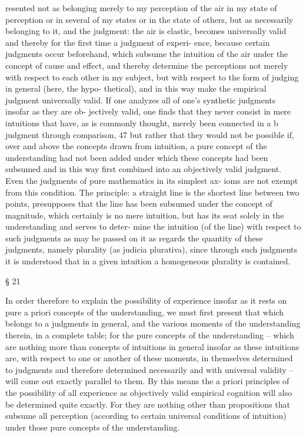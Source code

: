 resented not as belonging merely to my perception of the air in my state
of perception or in several of my states or in the state of others, but as
necessarily belonging to it, and the judgment: the air is elastic, becomes
universally valid and thereby for the ﬁrst time a judgment of experi-
ence, because certain judgments occur beforehand, which subsume the
intuition of the air under the concept of cause and effect, and thereby
determine the perceptions not merely with respect to each other in my
subject, but with respect to the form of judging in general (here, the hypo-
thetical), and in this way make the empirical judgment universally valid.
If one analyzes all of one’s synthetic judgments insofar as they are ob-
jectively valid, one ﬁnds that they never consist in mere intuitions that
have, as is commonly thought, merely been connected in a b judgment
through comparison, 47 but rather that they would not be possible if,
over and above the concepts drawn from intuition, a pure concept of
the understanding had not been added under which these concepts had
been subsumed and in this way ﬁrst combined into an objectively valid
judgment. Even the judgments of pure mathematics in its simplest ax-
ioms are not exempt from this condition. The principle: a straight line is
the shortest line between two points, presupposes that the line has been
subsumed under the concept of magnitude, which certainly is no mere
intuition, but has its seat solely in the understanding and serves to deter-
mine the intuition (of the line) with respect to such judgments as may be
passed on it as regards the quantity of these judgments, namely plurality
(as judicia plurativa), since through such judgments it is understood that
in a given intuition a homogeneous plurality is contained.

§ 21

In order therefore to explain the possibility of experience insofar as it
rests on pure a priori concepts of the understanding, we must ﬁrst present
that which belongs to a judgments in general, and the various moments of
the understanding therein, in a complete table; for the pure concepts of
the understanding – which are nothing more than concepts of intuitions
in general insofar as these intuitions are, with respect to one or another
of these moments, in themselves determined to judgments and therefore
determined necessarily and with universal validity – will come out exactly
parallel to them. By this means the a priori principles of the possibility
of all experience as objectively valid empirical cognition will also be
determined quite exactly. For they are nothing other than propositions
that subsume all perception (according to certain universal conditions of
intuition) under those pure concepts of the understanding.

